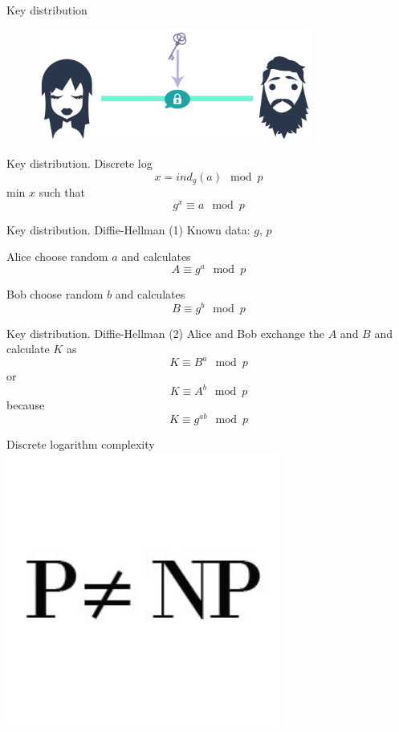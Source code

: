 \documentclass[10pt,pdf,hyperref={unicode}]{beamer}
\begin{document}
\begin{frame}{Key distribution}
 \begin{figure} 
   \includegraphics[width=90mm,scale=0.5]{keydistrib.png}
  \end{figure}
\end{frame}


\begin{frame}{Key distribution. Discrete log}
  \[
  x = ind_g\left(a\right) \mod{p}
  \]
  min $x$ such that
  \[
  g^x \equiv a \mod{p}
  \]
\end{frame}

\begin{frame}{Key distribution. Diffie-Hellman (1)}
  Known data: $g$, $p$
  
  Alice choose random $a$ and calculates
  \[
  A \equiv g^a \mod{p}
  \]

  Bob choose random $b$ and calculates
  \[
  B \equiv g^b \mod{p}
  \]
\end{frame}

\begin{frame}{Key distribution. Diffie-Hellman (2)}
  Alice and Bob exchange the $A$ and $B$ and calculate $K$ as
  \[
  K \equiv B^a \mod{p}
  \]
  or
  \[
  K \equiv A^b \mod{p}
  \]
  because
  \[
  K \equiv g^{ab} \mod{p}
  \]
\end{frame}

\begin{frame}{Discrete logarithm complexity}
  \includegraphics[width=90mm,scale=0.5]{p_np.jpg}
\end{frame}
\end{document}
